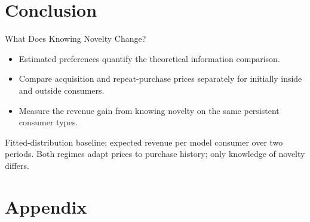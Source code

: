 \documentclass[aspectratio=169,professionalfonts]{beamer}
\newcommand{\shortbuttons}{}
\newif\ifshortappendix
\begin{document}
\section{Conclusion}

\gdef\shortbuttons{}
\begin{frame}[label=short-50]{What Does Knowing Novelty Change?}
  \begin{itemize}
    \item Estimated preferences quantify the theoretical information comparison.
    \item Compare acquisition and repeat-purchase prices separately for initially inside and outside consumers.
    \item Measure the revenue gain from knowing novelty on the same persistent consumer types.
  \end{itemize}
  \begin{tcolorbox}
  \end{tcolorbox}
  \par\smallskip\footnotesize Fitted-distribution baseline; expected revenue per model consumer over two periods.
  Both regimes adapt prices to purchase history; only knowledge of novelty differs.
\end{frame}





\appendix

\shortappendixtrue

\section{Appendix}
\end{document}
